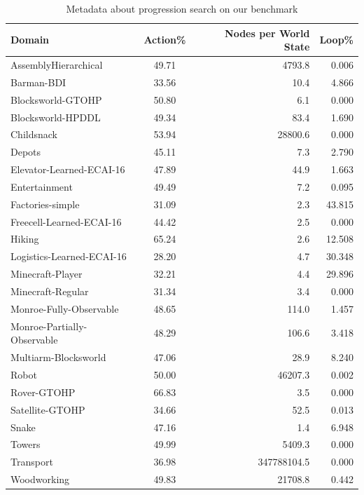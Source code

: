 \begin{table}[!hbp]
	\caption{Metadata about progression search on our benchmark}
	\label{table: tohtn metadata}
	\centering
	\begin{tabular}{|l|c|r|r|}
		\hline
		Domain & Action\% & Nodes per World State & Loop\% \\
		\hline
		AssemblyHierarchical & 49.71 & 4793.8 & 0.006\\
		Barman-BDI & 33.56 & 10.4 & 4.866\\
		Blocksworld-GTOHP & 50.80 & 6.1 & 0.000\\
		Blocksworld-HPDDL & 49.34 & 83.4 & 1.690\\
		Childsnack & 53.94 & 28800.6 & 0.000\\
		Depots & 45.11 & 7.3 & 2.790\\
		Elevator-Learned-ECAI-16 & 47.89 & 44.9 & 1.663\\
		Entertainment & 49.49 & 7.2 & 0.095\\
		Factories-simple & 31.09 & 2.3 & 43.815\\
		Freecell-Learned-ECAI-16 & 44.42 & 2.5 & 0.000\\
		Hiking & 65.24 & 2.6 & 12.508\\
		Logistics-Learned-ECAI-16 & 28.20 & 4.7 & 30.348\\
		Minecraft-Player & 32.21 & 4.4 & 29.896\\
		Minecraft-Regular & 31.34 & 3.4 & 0.000\\
		Monroe-Fully-Observable & 48.65 & 114.0 & 1.457\\
		Monroe-Partially-Observable & 48.29 & 106.6 & 3.418\\
		Multiarm-Blocksworld & 47.06 & 28.9 & 8.240\\
		Robot & 50.00 & 46207.3 & 0.002\\
		Rover-GTOHP & 66.83 & 3.5 & 0.000\\
		Satellite-GTOHP & 34.66 & 52.5 & 0.013\\
		Snake & 47.16 & 1.4 & 6.948\\
		Towers & 49.99 & 5409.3 & 0.000\\
		Transport & 36.98 & 347788104.5 & 0.000\\
		Woodworking & 49.83 & 21708.8 & 0.442\\
		\hline
	\end{tabular}
\end{table}

